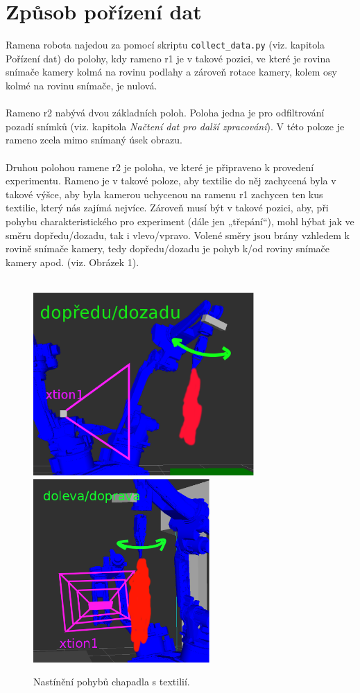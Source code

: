 \documentclass[10pt,a4paper,titlepage,oneside]{book}
\begin{document}
\section*{Způsob pořízení dat}
Ramena robota najedou za pomocí skriptu \verb|collect_data.py| (viz. kapitola Pořízení dat) do polohy, kdy rameno r1 je v takové pozici, ve které je rovina snímače kamery kolmá na rovinu podlahy a zároveň rotace kamery, kolem osy kolmé na rovinu snímače, je nulová.\\
\\
Rameno r2 nabývá dvou základních poloh. Poloha jedna je pro odfiltrování pozadí snímků (viz. kapitola \textit{Načtení dat pro další zpracování}). V této poloze je rameno zcela mimo snímaný úsek obrazu.\\
\\ 
Druhou polohou ramene r2 je poloha, ve které je připraveno k provedení experimentu. Rameno je v takové poloze, aby textilie do něj zachycená byla v takové výšce, aby byla kamerou uchycenou na ramenu r1 zachycen ten kus textilie, který nás zajímá nejvíce. Zároveň musí být v takové pozici, aby, při pohybu charakteristického pro experiment (dále jen „třepání“), mohl hýbat jak ve směru dopředu/dozadu, tak i vlevo/vpravo. Volené směry jsou brány vzhledem k rovině snímače kamery, tedy dopředu/dozadu je pohyb k/od roviny snímače kamery apod. (viz. Obrázek 1).\\
\\
\begin{figure}[H]
	\centering  	
  	\includegraphics[height=7cm]{pictures/obrazek1.eps}
  	\includegraphics[height=7cm]{pictures/obrazek2.eps}
  	\caption{Nastínění pohybů chapadla s textilií.}
  	\label{fig:obrazek1}
\end{figure}
\end{document}
